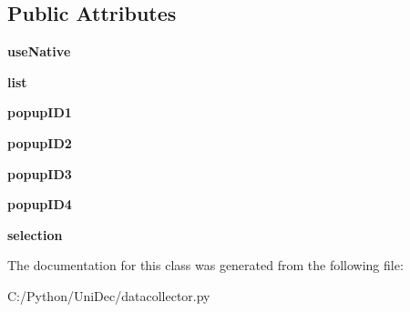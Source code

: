 \subsection*{Public Attributes}
\begin{DoxyCompactItemize}
\item 
\hypertarget{class_uni_dec_1_1datacollector_1_1_list_ctrl_panel_a194277be664ba79d6dc1eb2fe51fcd74}{}{\bfseries use\+Native}\label{class_uni_dec_1_1datacollector_1_1_list_ctrl_panel_a194277be664ba79d6dc1eb2fe51fcd74}

\item 
\hypertarget{class_uni_dec_1_1datacollector_1_1_list_ctrl_panel_a4edc446130b78132d51247bbe0e0e490}{}{\bfseries list}\label{class_uni_dec_1_1datacollector_1_1_list_ctrl_panel_a4edc446130b78132d51247bbe0e0e490}

\item 
\hypertarget{class_uni_dec_1_1datacollector_1_1_list_ctrl_panel_acea626c02f1ce689b95d832d479de8f8}{}{\bfseries popup\+I\+D1}\label{class_uni_dec_1_1datacollector_1_1_list_ctrl_panel_acea626c02f1ce689b95d832d479de8f8}

\item 
\hypertarget{class_uni_dec_1_1datacollector_1_1_list_ctrl_panel_aa2dedfbd88cbeee6d3e7673577206fa8}{}{\bfseries popup\+I\+D2}\label{class_uni_dec_1_1datacollector_1_1_list_ctrl_panel_aa2dedfbd88cbeee6d3e7673577206fa8}

\item 
\hypertarget{class_uni_dec_1_1datacollector_1_1_list_ctrl_panel_a63bc2ef6bbf43ea119154b66ad0b2bbc}{}{\bfseries popup\+I\+D3}\label{class_uni_dec_1_1datacollector_1_1_list_ctrl_panel_a63bc2ef6bbf43ea119154b66ad0b2bbc}

\item 
\hypertarget{class_uni_dec_1_1datacollector_1_1_list_ctrl_panel_af2aa14072bdabe4c2dd1456ef179f1da}{}{\bfseries popup\+I\+D4}\label{class_uni_dec_1_1datacollector_1_1_list_ctrl_panel_af2aa14072bdabe4c2dd1456ef179f1da}

\item 
\hypertarget{class_uni_dec_1_1datacollector_1_1_list_ctrl_panel_acb97652b5e31ccee5a89c5f12120585c}{}{\bfseries selection}\label{class_uni_dec_1_1datacollector_1_1_list_ctrl_panel_acb97652b5e31ccee5a89c5f12120585c}

\end{DoxyCompactItemize}


The documentation for this class was generated from the following file\+:\begin{DoxyCompactItemize}
\item 
C\+:/\+Python/\+Uni\+Dec/datacollector.\+py\end{DoxyCompactItemize}
